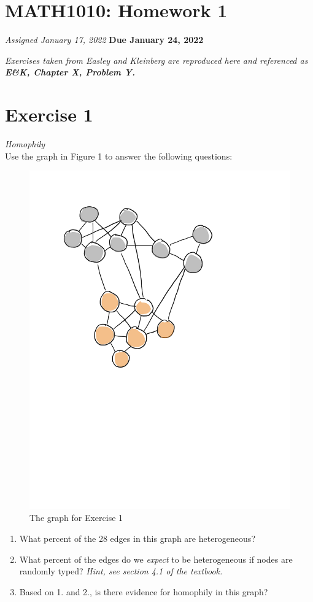 \documentclass{tufte-handout}
\newcommand{\solution}[1]{
\begin{adjustwidth}{1cm}{}
\textit{\color{SolutionColor} #1}
\end{adjustwidth}}
\begin{document}
\begin{fullwidth} 
\section{MATH1010: Homework 1}
    \textit{Assigned January 17, 2022}
    \textbf{Due January 24, 2022}
    \vspace{.2cm}
    
\noindent\textit{Exercises taken from Easley and Kleinberg are reproduced here and referenced as \textbf{E\&K, Chapter X, Problem Y.}}    

\section*{\textbf{Exercise 1}}
\textit{Homophily}\\
Use the graph in Figure 1 to answer the following questions:
\begin{figure}[!h]
    \centering
    \includegraphics[width = .3\textwidth]{homophily.pdf}
    \caption{The graph for Exercise 1}
\end{figure}
\begin{enumerate}
    \item What percent of the 28 edges in this graph are heterogeneous?
    \item What percent of the edges do we \textit{expect} to be heterogeneous if nodes are randomly typed? \textit{Hint, see section 4.1 of the textbook.}
    \item Based on 1. and 2., is there evidence for homophily in this graph?
\end{enumerate}

\end{fullwidth}
\end{document}
